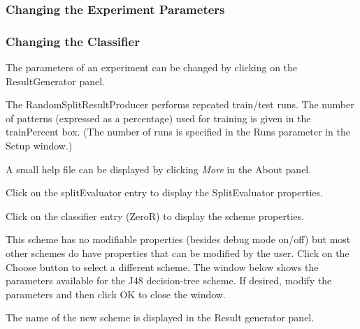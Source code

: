 \documentclass[a4paper]{article}
\begin{document}
\subsubsection{Changing the Experiment Parameters}

\subsubsection*{Changing the Classifier}

The parameters of an experiment can be changed by clicking on the ResultGenerator panel.
\begin{center}
\end{center}

The RandomSplitResultProducer performs repeated train/test runs. The number of patterns (expressed as a percentage) used for training is given in the trainPercent box. (The number of runs is specified in the Runs parameter in the Setup window.)

A small help file can be displayed by clicking \textit{More} in the About panel.
\begin{center}
\end{center}

Click on the splitEvaluator entry to display the SplitEvaluator properties.
\begin{center}
\end{center}

Click on the classifier entry (ZeroR) to display the scheme properties.
\begin{center}
\end{center}

This scheme has no modifiable properties (besides debug mode on/off) but most other schemes do have properties that can be modified by the user. Click on the Choose button to select a different scheme. The window below shows the parameters available for the J48 decision-tree scheme. If desired, modify the parameters and then click OK to close the window.
\begin{center}
\end{center}

The name of the new scheme is displayed in the Result generator panel.
\begin{center}
\end{center}
\end{document}
